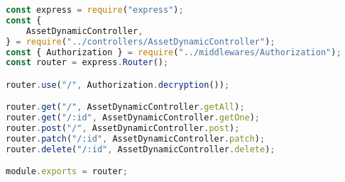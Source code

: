\begin{lstlisting}[language=Javascript,caption={Asset Dynamic Route}]
const express = require("express");
const {
	AssetDynamicController,
} = require("../controllers/AssetDynamicController");
const { Authorization } = require("../middlewares/Authorization");
const router = express.Router();

router.use("/", Authorization.decryption());

router.get("/", AssetDynamicController.getAll);
router.get("/:id", AssetDynamicController.getOne);
router.post("/", AssetDynamicController.post);
router.patch("/:id", AssetDynamicController.patch);
router.delete("/:id", AssetDynamicController.delete);

module.exports = router;
\end{lstlisting}